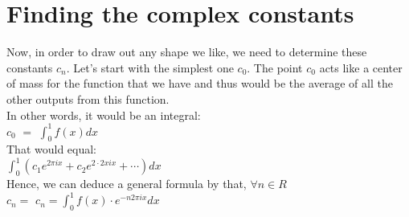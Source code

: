 \documentclass{article}
\begin{document}
\section{Finding the complex constants}
Now, in order to draw out any shape we like, we need to determine these constants $c_{n}$. 
Let's start with the simplest one $c_{0}$. The point $c_{0}$ acts like a center of mass for the function that we have and thus would be the average of all the other outputs from this function.\\
In other words, it would be an integral:\\
$c_{0}$ $ = $ $\int_{0}^{1} f(x) dx$\\
That would equal:\\
$\int _ { 0 } ^ { 1 } \left( c _ { 1 } e ^ { 2 \pi i x } + c _ { 2 } e ^ { 2 \cdot 2 x i x } + \cdots \right) d x$\\
Hence, we can deduce a general formula by that, 
$\forall n \in {R}$\\
$c_{n} = $
$c _ { n } = \int _ { 0 } ^ { 1 } f ( x ) \cdot e ^ { - n 2 \pi i x } d x $\\
\\
\\
\end{document}
